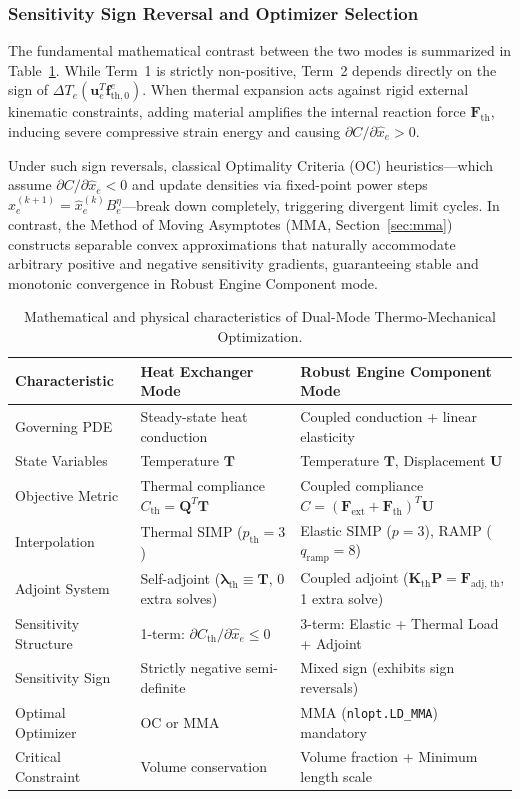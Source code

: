 \documentclass[11pt, a4paper]{article}
\begin{document}
\subsubsection{Sensitivity Sign Reversal and Optimizer Selection}
The fundamental mathematical contrast between the two modes is summarized in Table~\ref{tab:mode_comparison}. While Term~1 is strictly non-positive, Term~2 depends directly on the sign of $\Delta T_e (\mathbf{u}_e^T \mathbf{f}_{\text{th}, 0}^e)$. When thermal expansion acts against rigid external kinematic constraints, adding material amplifies the internal reaction force $\mathbf{F}_{\text{th}}$, inducing severe compressive strain energy and causing $\partial C / \partial \hat{x}_e > 0$.

Under such sign reversals, classical Optimality Criteria (OC) heuristics---which assume $\partial C / \partial \hat{x}_e < 0$ and update densities via fixed-point power steps $\hat{x}_e^{(k+1)} = \hat{x}_e^{(k)} B_e^\eta$---break down completely, triggering divergent limit cycles. In contrast, the Method of Moving Asymptotes (MMA, Section~\ref{sec:mma}) constructs separable convex approximations that naturally accommodate arbitrary positive and negative sensitivity gradients, guaranteeing stable and monotonic convergence in Robust Engine Component mode.

\begin{table}[htbp]
\centering
\small
\caption{Mathematical and physical characteristics of Dual-Mode Thermo-Mechanical Optimization.}
\label{tab:mode_comparison}
\begin{tabular}{p{3.2cm} p{5.6cm} p{6.4cm}}
\hline
\textbf{Characteristic} & \textbf{Heat Exchanger Mode} & \textbf{Robust Engine Component Mode} \\
\hline
Governing PDE & Steady-state heat conduction & Coupled conduction + linear elasticity \\
State Variables & Temperature $\mathbf{T}$ & Temperature $\mathbf{T}$, Displacement $\mathbf{U}$ \\
Objective Metric & Thermal compliance $C_{\text{th}} = \mathbf{Q}^T \mathbf{T}$ & Coupled compliance $C = (\mathbf{F}_{\text{ext}} + \mathbf{F}_{\text{th}})^T \mathbf{U}$ \\
Interpolation & Thermal SIMP ($p_{\text{th}} = 3$) & Elastic SIMP ($p=3$), RAMP ($q_{\text{ramp}} = 8$) \\
Adjoint System & Self-adjoint ($\boldsymbol{\lambda}_{\text{th}} \equiv \mathbf{T}$, 0 extra solves) & Coupled adjoint ($\mathbf{K}_{\text{th}} \mathbf{P} = \mathbf{F}_{\text{adj, th}}$, 1 extra solve) \\
Sensitivity Structure & 1-term: $\partial C_{\text{th}}/\partial \hat{x}_e \le 0$ & 3-term: Elastic + Thermal Load + Adjoint \\
Sensitivity Sign & Strictly negative semi-definite & Mixed sign (exhibits sign reversals) \\
Optimal Optimizer & OC or MMA & MMA (\texttt{nlopt.LD\_MMA}) mandatory \\
Critical Constraint & Volume conservation & Volume fraction + Minimum length scale \\
\hline
\end{tabular}
\end{table}
\end{document}
